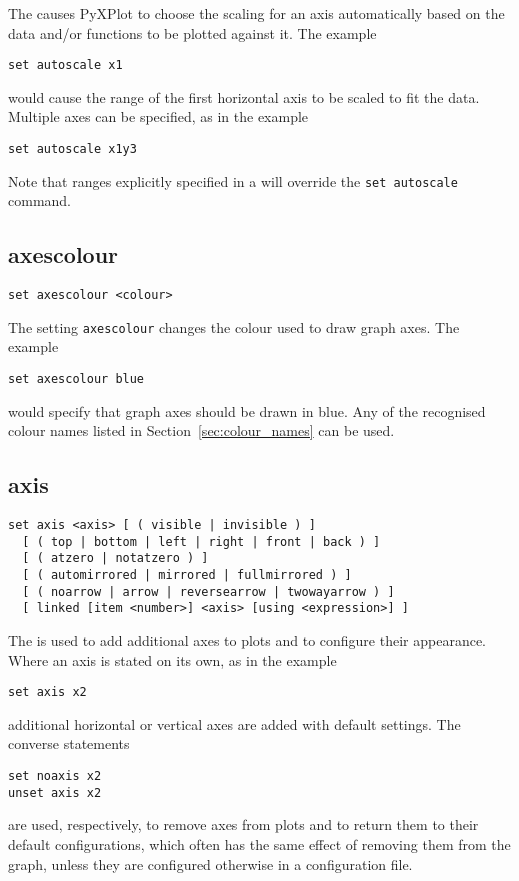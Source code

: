 The  causes PyXPlot to choose the scaling for an axis
automatically based on the data and/or functions to be plotted against it. The
example

\begin{verbatim}
set autoscale x1
\end{verbatim}

\noindent would cause the range of the first horizontal axis to be scaled to
fit the data.  Multiple axes can be specified, as in the example

\begin{verbatim}
set autoscale x1y3
\end{verbatim}

\noindent Note that ranges explicitly specified in a  will
override the {\tt set autoscale} command.


\subsection{axescolour}

\begin{verbatim}
set axescolour <colour>
\end{verbatim}

The setting {\tt axescolour} changes the colour used to draw graph axes.  The example

\begin{verbatim}
set axescolour blue
\end{verbatim}

\noindent would specify that graph axes should be drawn in blue. Any of the
recognised colour names listed in Section~\ref{sec:colour_names} can be used.


\subsection{axis}

\begin{verbatim}
set axis <axis> [ ( visible | invisible ) ]
  [ ( top | bottom | left | right | front | back ) ]
  [ ( atzero | notatzero ) ]
  [ ( automirrored | mirrored | fullmirrored ) ]
  [ ( noarrow | arrow | reversearrow | twowayarrow ) ]
  [ linked [item <number>] <axis> [using <expression>] ]
\end{verbatim}

The  is used to add additional axes to plots and to
configure their appearance. Where an axis is stated on its own, as in the
example
\begin{verbatim}
set axis x2
\end{verbatim}
additional horizontal or vertical axes are added with default
settings. The converse statements
\begin{verbatim}
set noaxis x2
unset axis x2
\end{verbatim}
are used, respectively, to remove axes from plots and to return them
to their default configurations, which often has the same effect of removing
them from the graph, unless they are configured otherwise in a configuration
file.

